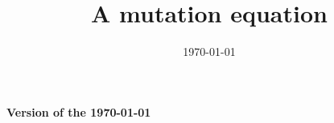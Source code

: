 \documentclass[11pt]{amsart}
\title{A mutation equation}
\author{}
\date{\today}
\renewcommand{\Re}{\mathfrak{R}e}
\newcommand{\supp}{\mathrm{supp}\,}
\begin{document}
\maketitle
\begin{center}
    \textbf{Version of the \today}
\end{center}

\tableofcontents





    
    
\end{document}
